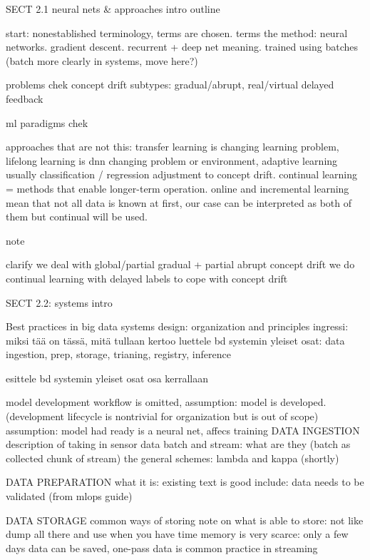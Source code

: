 SECT 2.1 neural nets & approaches intro
outline

start: nonestablished terminology, terms are chosen.
terms
the method: neural networks. gradient descent. recurrent + deep net meaning. trained using batches (batch more clearly in systems, move here?)

	problems chek
		concept drift
		subtypes: gradual/abrupt, real/virtual
		delayed feedback

	ml paradigms chek
	    
		approaches that are not this: transfer learning is changing learning problem, lifelong learning is dnn changing problem or environment, adaptive learning usually classification / regression adjustment to concept drift. continual learning = methods that enable longer-term operation. online and incremental learning mean that not all data is known at first, our case can be interpreted as both of them but continual will be used.

		
note

clarify
	we deal with global/partial gradual + partial abrupt concept drift
	we do continual learning with delayed labels to cope with concept drift

SECT 2.2: systems intro

Best practices in big data systems design: organization and principles
ingressi: miksi tää on tässä, mitä tullaan kertoo
luettele bd systemin yleiset osat: data ingestion, prep, storage, trianing, registry, inference

esittele bd systemin yleiset osat osa kerrallaan

	model development workflow is omitted, assumption: model is developed. (development lifecycle is nontrivial for organization but is out of scope) assumption: model had ready is a neural net, affecs training
	DATA INGESTION
	description of taking in sensor data
	batch and stream: what are they (batch as collected chunk of stream)
	the general schemes: lambda and kappa (shortly)

	DATA PREPARATION
	what it is: existing text is good
	include: data needs to be validated (from mlops guide)

	DATA STORAGE
	common ways of storing
	note on what is able to store: 
		not like dump all there and use when you have time
		memory is very scarce: only a few days data can be saved, one-pass data is common practice in streaming
		

